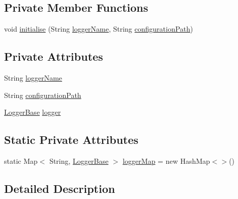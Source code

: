 \subsection*{Private Member Functions}
\begin{DoxyCompactItemize}
\item 
void \hyperlink{classit_1_1emarolab_1_1cagg_1_1debugging_1_1DebuggingText_a954881bbc398945ecd4bb9eaee1ecc56}{initialise} (String \hyperlink{classit_1_1emarolab_1_1cagg_1_1debugging_1_1DebuggingText_afa1175bdb0c7a658affe0b25a8a924c3}{logger\-Name}, String \hyperlink{classit_1_1emarolab_1_1cagg_1_1debugging_1_1DebuggingText_a4e65225034622175b3378a1a7b7c311b}{configuration\-Path})
\end{DoxyCompactItemize}
\subsection*{Private Attributes}
\begin{DoxyCompactItemize}
\item 
String \hyperlink{classit_1_1emarolab_1_1cagg_1_1debugging_1_1DebuggingText_afa1175bdb0c7a658affe0b25a8a924c3}{logger\-Name}
\item 
String \hyperlink{classit_1_1emarolab_1_1cagg_1_1debugging_1_1DebuggingText_a4e65225034622175b3378a1a7b7c311b}{configuration\-Path}
\item 
\hyperlink{classit_1_1emarolab_1_1cagg_1_1debugging_1_1DebuggingText_1_1LoggerBase}{Logger\-Base} \hyperlink{classit_1_1emarolab_1_1cagg_1_1debugging_1_1DebuggingText_aa7afec4cc4e3688d720b5ee81a59aa0e}{logger}
\end{DoxyCompactItemize}
\subsection*{Static Private Attributes}
\begin{DoxyCompactItemize}
\item 
static Map$<$ String, \hyperlink{classit_1_1emarolab_1_1cagg_1_1debugging_1_1DebuggingText_1_1LoggerBase}{Logger\-Base} $>$ \hyperlink{classit_1_1emarolab_1_1cagg_1_1debugging_1_1DebuggingText_a975b5abd8066a5867cd1a21e4b69b2ba}{logger\-Map} = new Hash\-Map$<$$>$()
\end{DoxyCompactItemize}


\subsection{Detailed Description}


